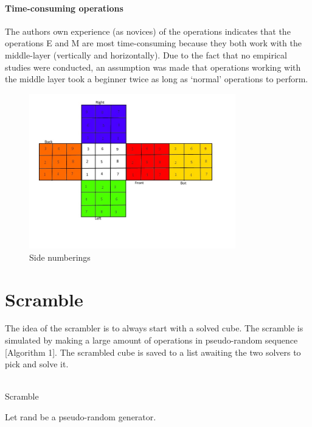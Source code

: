 \documentclass[a4paper,11pt]{kth-mag}
\begin{document}
\paragraph{Time-consuming operations}
The authors own experience (as novices) of the operations indicates that the operations E and M are most time-consuming because they both work with the middle-layer (vertically and horizontally).
Due to the fact that no empirical studies were conducted, an assumption was made that operations working with the middle layer took a beginner twice as long as `normal' operations to perform.

\begin{figure}[b]
	\centering
	\includegraphics[width= 0.8\textwidth]{figs/cubeorder.jpg}
	\caption{Side numberings}
	\label{fig_17}
\end{figure}  
\section{Scramble}
The idea of the scrambler is to always start with a solved cube. The scramble is simulated by making a large amount of operations in pseudo-random sequence [Algorithm 1]. The scrambled cube is saved to a list awaiting the two solvers to pick and solve it.\\\\
	\begin{algorithm}[H]
	\caption{Scramble}
	Let rand be a pseudo-random generator.\\

	\end{algorithm}
\end{document}
